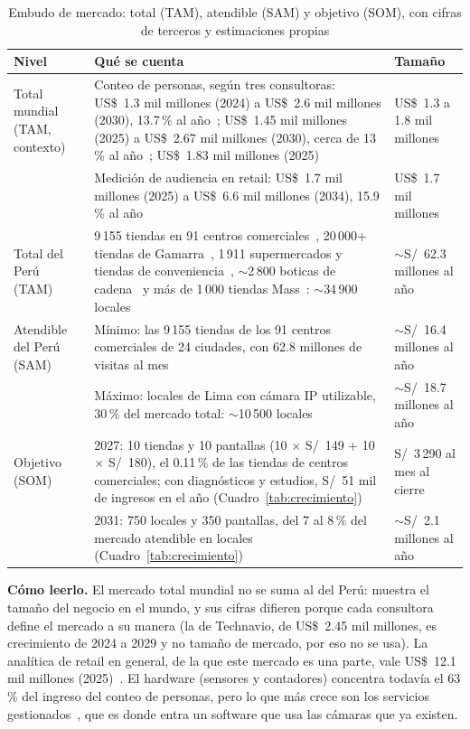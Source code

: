 \documentclass[12pt,a4paper]{article}
\begin{document}
\begin{table}[H]
\caption{Embudo de mercado: total (TAM), atendible (SAM) y objetivo (SOM), con cifras de terceros y estimaciones propias}
\label{tab:mercado}
\centering
\footnotesize
\renewcommand{\arraystretch}{1.12}
\begin{tabular}{|L{0.12\textwidth}|L{0.50\textwidth}|L{0.26\textwidth}|}
\hline
\textbf{Nivel} & \textbf{Qué se cuenta} & \textbf{Tamaño} \\
\hline
Total mundial (TAM, contexto) & Conteo de personas, según tres consultoras: US\$~1.3 mil millones (2024) a US\$~2.6 mil millones (2030), 13.7\,\% al año~\cite{grandview}; US\$~1.45 mil millones (2025) a US\$~2.67 mil millones (2030), cerca de 13\,\% al año~\cite{mordor}; US\$~1.83 mil millones (2025)~\cite{intelmr} & US\$~1.3 a 1.8 mil millones \\
 & Medición de audiencia en retail: US\$~1.7 mil millones (2025) a US\$~6.6 mil millones (2034), 15.9\,\% al año~\cite{gmi} & US\$~1.7 mil millones \\
\hline
Total del Perú (TAM) & 9\,155 tiendas en 91 centros comerciales~\cite{accepclicc}, 20\,000+ tiendas de Gamarra~\cite{peruretail}, 1\,911 supermercados y tiendas de conveniencia~\cite{forbes}, $\sim$2\,800 boticas de cadena~\cite{gestion} y más de 1\,000 tiendas Mass~\cite{massretail}: $\sim$34\,900 locales & $\sim$S/~62.3 millones al año \\
\hline
Atendible del Perú (SAM) & Mínimo: las 9\,155 tiendas de los 91 centros comerciales de 24 ciudades, con 62.8 millones de visitas al mes~\cite{accepclicc} & $\sim$S/~16.4 millones al año \\
 & Máximo: locales de Lima con cámara IP utilizable, 30\,\% del mercado total: $\sim$10\,500 locales & $\sim$S/~18.7 millones al año \\
\hline
Objetivo (SOM) & 2027: 10 tiendas y 10 pantallas (10 $\times$ S/~149 + 10 $\times$ S/~180), el 0.11\,\% de las tiendas de centros comerciales; con diagnósticos y estudios, S/~51 mil de ingresos en el año (Cuadro~\ref{tab:crecimiento}) & S/~3\,290 al mes al cierre \\
 & 2031: 750 locales y 350 pantallas, del 7 al 8\,\% del mercado atendible en locales (Cuadro~\ref{tab:crecimiento}) & $\sim$S/~2.1 millones al año \\
\hline
\end{tabular}
\end{table}

\textbf{Cómo leerlo.} El mercado total mundial no se suma al del Perú: muestra el tamaño
del negocio en el mundo, y sus cifras difieren porque cada consultora define el
mercado a su manera (la de Technavio, de US\$~2.45 mil millones, es
crecimiento de 2024 a 2029 y no tamaño de mercado, por eso no se usa). La
analítica de retail en general, de la que este mercado es una parte, vale
US\$~12.1 mil millones (2025)~\cite{imarc}. El hardware (sensores y
contadores) concentra todavía el 63\,\% del ingreso del conteo de personas,
pero lo que más crece son los servicios gestionados~\cite{mordor}, que es donde
entra un software que usa las cámaras que ya existen.
\end{document}
